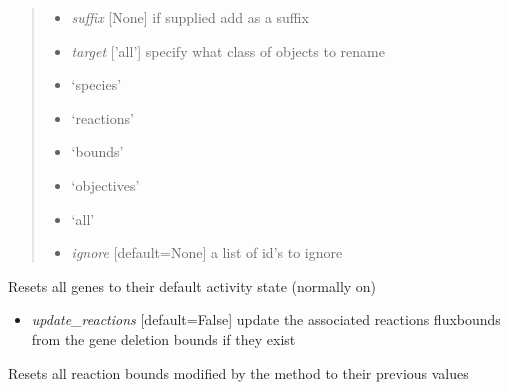 \documentclass[a4paper,11pt,english]{sphinxmanual}
\begin{document}
\begin{fulllineitems}
\begin{fulllineitems}
\begin{quote}
\begin{itemize}
\item {} 
\emph{suffix} {[}None{]} if supplied add as a suffix

\item {} 
\emph{target} {[}'all'{]} specify what class of objects to rename

\end{itemize}
\begin{itemize}
\item {} 
`species'

\item {} 
`reactions'

\item {} 
`bounds'

\item {} 
`objectives'

\item {} 
`all'

\end{itemize}
\begin{itemize}
\item {} 
\emph{ignore} {[}default=None{]} a list of id's to ignore

\end{itemize}
\end{quote}

\end{fulllineitems}


\begin{fulllineitems}
\label{modules_doc:cbmpy.CBModel.Model.resetAllGenes}
Resets all genes to their default activity state (normally on)
\begin{itemize}
\item {} 
\emph{update\_reactions} {[}default=False{]} update the associated reactions fluxbounds from the gene deletion bounds if they exist

\end{itemize}

\end{fulllineitems}


\begin{fulllineitems}
\label{modules_doc:cbmpy.CBModel.Model.resetAllInactiveGPRBounds}
Resets all reaction bounds modified by the  method to their previous values


\end{fulllineitems}
\end{fulllineitems}
\end{document}
